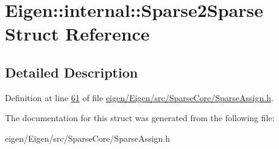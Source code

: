 \hypertarget{struct_eigen_1_1internal_1_1_sparse2_sparse}{}\section{Eigen\+:\+:internal\+:\+:Sparse2\+Sparse Struct Reference}
\label{struct_eigen_1_1internal_1_1_sparse2_sparse}


\subsection{Detailed Description}


Definition at line \hyperlink{eigen_2_eigen_2src_2_sparse_core_2_sparse_assign_8h_source_l00061}{61} of file \hyperlink{eigen_2_eigen_2src_2_sparse_core_2_sparse_assign_8h_source}{eigen/\+Eigen/src/\+Sparse\+Core/\+Sparse\+Assign.\+h}.



The documentation for this struct was generated from the following file\+:\begin{DoxyCompactItemize}
\item 
eigen/\+Eigen/src/\+Sparse\+Core/\+Sparse\+Assign.\+h\end{DoxyCompactItemize}

